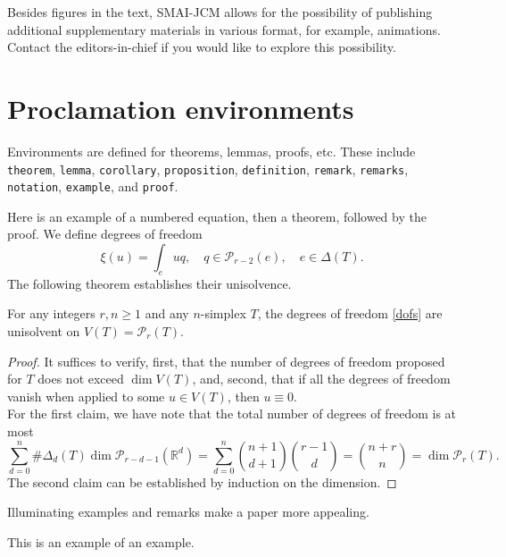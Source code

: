 \documentclass[a4paper]
{cedram-smai-jcm}
\begin{document}
Besides figures in the text, SMAI-JCM allows for the possibility of publishing
additional supplementary materials in various format, for example, animations.
Contact the editors-in-chief if you would like to explore this possibility.


\section{Proclamation environments}

Environments are defined for theorems, lemmas, proofs, etc.
These include \verb#theorem#, \verb#lemma#, \verb#corollary#,
\verb#proposition#, \verb#definition#, \verb#remark#, \verb#remarks#,
\verb#notation#, \verb#example#, and \verb#proof#.

Here is an example of a numbered equation, then a theorem, followed by the proof.
We define degrees of freedom 
\begin{equation}\label{dofs}
\xi(u) = \int_e uq, \quad q\in \mathcal P_{r-2}(e),\quad e\in \Delta(T).
\end{equation}
The following theorem establishes their unisolvence.

\begin{theorem}\label{th:true}
  For any integers $r,n\ge 1$ and any $n$-simplex $T$, the degrees of
  freedom \eqref{dofs} are unisolvent on $V(T)=\mathcal P_r(T)$.
\end{theorem}

\begin{proof}
  It suffices to verify, first, that the number of degrees of freedom proposed
  for $T$ does not exceed $\dim V(T)$, and, second, that if all the degrees of
  freedom vanish when applied to some $u\in V(T)$, then $u\equiv 0$. \\
  For the first claim, we have note that
  the total number of degrees of freedom is at most
$$
\sum_{d=0}^n\#\Delta_d(T)\dim\mathcal P_{r-d-1}(\mathbb R^d)=
\sum_{d=0}^n\binom{n+1}{d+1}\binom{r-1}{d}=\binom{n+r}{n}=\dim\mathcal P_r(T).
$$
The second claim can be established by induction on the dimension.
\end{proof}

Illuminating examples and remarks make a paper more appealing.

\begin{example}\label{ex:good}
  This is an example of an example.
\end{example}
\end{document}
